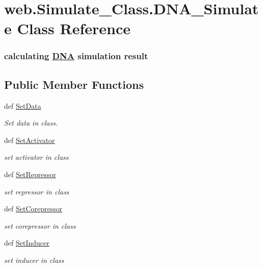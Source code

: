 \hypertarget{classweb_1_1_simulate___class_1_1_d_n_a___simulate}{\section{web.\-Simulate\-\_\-\-Class.\-D\-N\-A\-\_\-\-Simulate Class Reference}
\label{classweb_1_1_simulate___class_1_1_d_n_a___simulate}
}


\subsubsection*{calculating \hyperlink{class_d_n_a}{D\-N\-A} simulation result } 


\subsection*{Public Member Functions}
\begin{DoxyCompactItemize}
\item 
def \hyperlink{classweb_1_1_simulate___class_1_1_d_n_a___simulate_a06ff5bd8c89a820405d937a5f8a837f3}{Set\-Data}
\begin{DoxyCompactList}\small\item\em Set data in class. \end{DoxyCompactList}\item 
def \hyperlink{classweb_1_1_simulate___class_1_1_d_n_a___simulate_ad17aed6fe820df86a76eae9e307c6fbc}{Set\-Activator}
\begin{DoxyCompactList}\small\item\em set activator in class \end{DoxyCompactList}\item 
def \hyperlink{classweb_1_1_simulate___class_1_1_d_n_a___simulate_af3ad470a356961ff4019e740f813e321}{Set\-Repressor}
\begin{DoxyCompactList}\small\item\em set repressor in class \end{DoxyCompactList}\item 
def \hyperlink{classweb_1_1_simulate___class_1_1_d_n_a___simulate_a467aabf0e04b68c0b813931ffdfbd86c}{Set\-Corepressor}
\begin{DoxyCompactList}\small\item\em set corepressor in class \end{DoxyCompactList}\item 
def \hyperlink{classweb_1_1_simulate___class_1_1_d_n_a___simulate_ad7ed3917ea1662b7d8ebded6ae6c9275}{Set\-Inducer}
\begin{DoxyCompactList}\small\item\em set inducer in class \end{DoxyCompactList}\end{DoxyCompactItemize}
